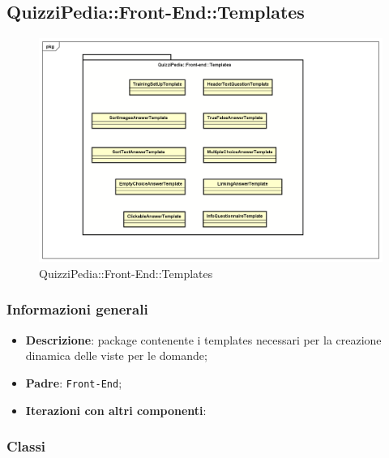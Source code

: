 \newpage

\subsection{QuizziPedia::Front-End::Templates}

	\label{QuizziPedia::Front-End::Templates}

	\begin{figure}[h]
		\centering
		\includegraphics[scale=0.5,keepaspectratio]{UML/Package/QuizziPedia_Front-end_Templates.png}
		\caption{QuizziPedia::Front-End::Templates}
	\end{figure}
	
	\subsubsection{Informazioni generali}
		\begin{itemize}
			\item \textbf{Descrizione}: package contenente i templates necessari per la creazione dinamica delle viste per le domande;
			\item \textbf{Padre}: \texttt{Front-End};
			\item \textbf{Iterazioni con altri componenti}: 
		\end{itemize}

	\subsubsection{Classi}
